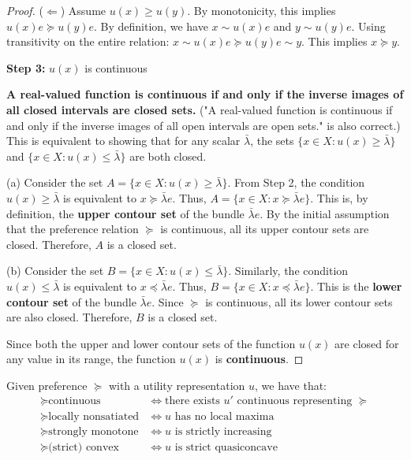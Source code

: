 \begin{proof}
    ($\Longleftarrow$) Assume $u(x) \geq u(y)$.
    By monotonicity, this implies $u(x)e \succeq u(y)e$.
    By definition, we have $x \sim u(x)e$ and $y \sim u(y)e$.
    Using transitivity on the entire relation: $x \sim u(x)e \succeq u(y)e \sim y$. This implies $x \succeq y$.

    \textbf{Step 3:} $u(x)$ is continuous

    \textbf{A real-valued function is continuous if and only if the inverse images of all closed intervals are closed sets.} ("A real-valued function is continuous if and only if the inverse images of all open intervals are open sets." is also correct.) This is equivalent to showing that for any scalar $\bar{\lambda}$, the sets $\{x \in X : u(x) \geq \bar{\lambda}\}$ and $\{x \in X : u(x) \leq \bar{\lambda}\}$ are both closed.

    (a) Consider the set $A = \{x \in X : u(x) \geq \bar{\lambda}\}$. From Step 2, the condition $u(x) \geq \bar{\lambda}$ is equivalent to $x \succeq \bar{\lambda}e$. Thus, $A = \{x \in X : x \succeq \bar{\lambda}e\}$. This is, by definition, the \textbf{upper contour set} of the bundle $\bar{\lambda}e$. By the initial assumption that the preference relation $\succeq$ is continuous, all its upper contour sets are closed. Therefore, $A$ is a closed set.

    (b) Consider the set $B = \{x \in X : u(x) \leq \bar{\lambda}\}$. Similarly, the condition $u(x) \leq \bar{\lambda}$ is equivalent to $x \preceq \bar{\lambda}e$. Thus, $B = \{x \in X : x \preceq \bar{\lambda}e\}$. This is the \textbf{lower contour set} of the bundle $\bar{\lambda}e$. Since $\succeq$ is continuous, all its lower contour sets are also closed. Therefore, $B$ is a closed set.

    Since both the upper and lower contour sets of the function $u(x)$ are closed for any value in its range, the function $u(x)$ is \textbf{continuous}.
\end{proof}

\begin{proposition}
    Given preference $\succeq $ with a utility representation $u$, we have that: \begin{align*}
        \succeq \text{continuous}          & \iff \text{there exists $u'$ continuous representing $\succeq $} \\
        \succeq \text{locally nonsatiated} & \iff \text{$u$ has no local maxima}                              \\
        \succeq \text{strongly monotone}   & \iff \text{$u$ is strictly increasing}                           \\
        \succeq \text{(strict) convex}     & \iff \text{$u$ is strict quasiconcave}                           \\
    \end{align*}
\end{proposition}


